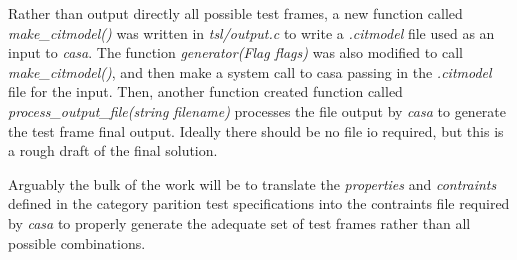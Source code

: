 \documentclass[a4full,12pt]{article}
\begin{document}
Rather than output directly all possible test frames, a new function called
  \emph{make_citmodel()} was written in \emph{tsl/output.c} to write a 
  \emph{.citmodel} file used as an input to \emph{casa}. The function
  \emph{generator(Flag flags)} was also modified to call \emph{make_citmodel()},
  and then make a system call to casa passing in the \emph{.citmodel} file for
  the input. Then, another function created function called
  \emph{process_output_file(string filename)} processes the file output by
  \emph{casa} to generate the test frame final output. Ideally there should be
  no file io required, but this is a rough draft of the final solution.
  
Arguably the bulk of the work will be to translate the \emph{properties} and 
  \emph{contraints} defined in the category parition test specifications into
  the contraints file required by \emph{casa} to properly generate the adequate
  set of test frames rather than all possible combinations.
\end{document}
